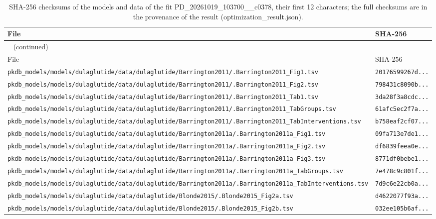 \begin{longtable}{ll}
\caption{SHA-256 checksums of the models and data of the fit PD\_20261019\_103700\_\_c0378, their first 12 characters; the full checksums are in the provenance of the result (optimization\_result.json).}\label{tab:checksums:PD_20261019_103700__c0378} \\
\toprule
File & SHA-256 \\
\midrule
\endfirsthead
\multicolumn{2}{l}{\small\tablename~\thetable{} (continued)} \\
\toprule
File & SHA-256 \\
\midrule
\endhead
\bottomrule
\endlastfoot
\texttt{pkdb\_models/models/dulaglutide/data/dulaglutide/Barrington2011/.Barrington2011\_Fig1.tsv} & \texttt{20176599267d...} \\
\texttt{pkdb\_models/models/dulaglutide/data/dulaglutide/Barrington2011/.Barrington2011\_Fig2.tsv} & \texttt{798431c8090b...} \\
\texttt{pkdb\_models/models/dulaglutide/data/dulaglutide/Barrington2011/.Barrington2011\_Tab1.tsv} & \texttt{3da28f3a8cdc...} \\
\texttt{pkdb\_models/models/dulaglutide/data/dulaglutide/Barrington2011/.Barrington2011\_TabGroups.tsv} & \texttt{61afc5ec2f7a...} \\
\texttt{pkdb\_models/models/dulaglutide/data/dulaglutide/Barrington2011/.Barrington2011\_TabInterventions.tsv} & \texttt{b758eaf2cf07...} \\
\texttt{pkdb\_models/models/dulaglutide/data/dulaglutide/Barrington2011a/.Barrington2011a\_Fig1.tsv} & \texttt{09fa713e7de1...} \\
\texttt{pkdb\_models/models/dulaglutide/data/dulaglutide/Barrington2011a/.Barrington2011a\_Fig2.tsv} & \texttt{df6839feea0e...} \\
\texttt{pkdb\_models/models/dulaglutide/data/dulaglutide/Barrington2011a/.Barrington2011a\_Fig3.tsv} & \texttt{8771df0bebe1...} \\
\texttt{pkdb\_models/models/dulaglutide/data/dulaglutide/Barrington2011a/.Barrington2011a\_TabGroups.tsv} & \texttt{7e478c9c801f...} \\
\texttt{pkdb\_models/models/dulaglutide/data/dulaglutide/Barrington2011a/.Barrington2011a\_TabInterventions.tsv} & \texttt{7d9c6e22cb0a...} \\
\texttt{pkdb\_models/models/dulaglutide/data/dulaglutide/Blonde2015/.Blonde2015\_Fig2a.tsv} & \texttt{d4622077f93a...} \\
\texttt{pkdb\_models/models/dulaglutide/data/dulaglutide/Blonde2015/.Blonde2015\_Fig2b.tsv} & \texttt{032ee105b6af...} \\

\end{longtable}
